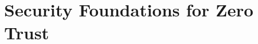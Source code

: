 \documentclass[12pt, a4paper, reqno, oneside]{book}
\begin{document}











\section{Security Foundations for Zero Trust}
\end{document}
